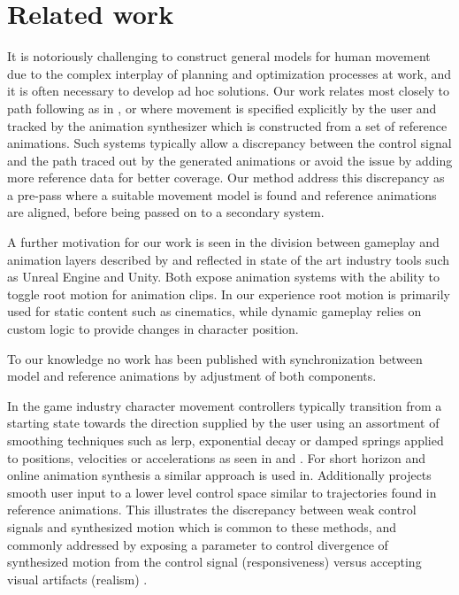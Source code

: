\section{Related work}
It is notoriously challenging to construct general models for human movement due to the complex interplay of planning and optimization processes at work, and it is often necessary to develop ad hoc solutions. Our work relates most closely to path following as in \citep{buttner15}, \citep{holden.16} or \citep{startke20} where movement is specified explicitly by the user and tracked by the animation synthesizer which is constructed from a set of reference animations. Such systems typically allow a discrepancy between the control signal and the path traced out by the generated animations or avoid the issue by adding more reference data for better coverage. Our method address this discrepancy as a pre-pass where a suitable movement model is found and reference animations are aligned, before being passed on to a secondary system.  

A further motivation for our work is seen in the division between gameplay and animation layers described by \citep{holden18} and reflected in state of the art industry tools such as Unreal Engine and Unity. Both expose animation systems with the ability to toggle root motion for animation clips. In our experience root motion is primarily used for static content such as cinematics, while dynamic gameplay relies on custom logic to provide changes in character position. 

To our knowledge no work has been published with synchronization between model and reference animations by adjustment of both components.

In the game industry character movement controllers typically transition from a starting state towards the direction supplied by the user using an assortment of smoothing techniques such as lerp, exponential decay or damped springs applied to positions, velocities or accelerations as seen in \citep{buttner20} and \citep{holden21}. For short horizon and online animation synthesis a similar approach is used in\citep{mccann07,holden.16,zhang18}. Additionally \citep{startke20} projects smooth user input to a lower level control space similar to trajectories found in reference animations. This illustrates the discrepancy between weak control signals and synthesized motion which is common to these methods, and commonly addressed by exposing a parameter to control divergence of synthesized motion from the control signal (responsiveness) versus accepting visual artifacts (realism) \citep{clavet16,zadziuk16}. 

